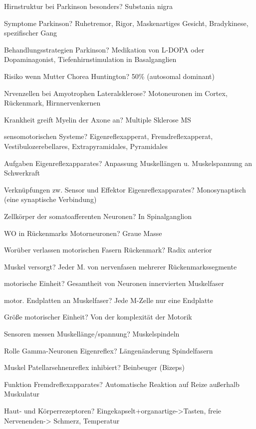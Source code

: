 \documentclass[a4paper]{article}
\begin{document}
\begin{multicols}{3}
  Hirnstruktur bei Parkinson besonders? Substania nigra

  Symptome Parkinson? Ruhetremor, Rigor, Maskenartiges Gesicht, Bradykinese, spezifischer Gang

  Behandlungsstrategien Parkinson? Medikation von L-DOPA oder Dopaminagonist, Tiefenhirnstimulation in Basalganglien

  Risiko wenn Mutter Chorea Huntington? 50\% (autosomal dominant)

  Nrvenzellen bei Amyotrophen Lateralsklerose? Motoneuronen im Cortex, Rückenmark, Hirnnervenkernen

  Krankheit greift Myelin der Axone an? Multiple Sklerose MS


  sensomotorischen Systeme? Eigenreflexapperat, Fremdreflexapperat, Vestibulozerebellares, Extrapyramidales, Pyramidales

  Aufgaben Eigenreflexapparates? Anpassung Muskellängen u. Muskelspannung an Schwerkraft

  Verknüpfungen zw. Sensor und Effektor Eigenreflexapparates? Monosynaptisch (eine synaptische Verbindung)

  Zellkörper der somatoafferenten Neuronen? In Spinalganglion%

  WO in Rückenmarks Motorneuronen? Graue Masse

  Worüber verlassen motorischen Fasern Rückenmark? Radix anterior

  Muskel versorgt? Jeder M. von nervenfasen mehrerer Rückenmarkssegmente

  motorische Einheit? Gesamtheit von Neuronen innervierten Muskelfaser

  motor. Endplatten an Muskelfaser? Jede M-Zelle nur eine Endplatte

  Größe motorischer Einheit? Von der komplexität der Motorik

  Sensoren messen Muskellänge/spannung? Muskelspindeln

  Rolle Gamma-Neuronen Eigenreflex? Längenänderung Spindelfasern

  Muskel Patellarsehnenreflex inhibiert? Beinbeuger (Bizeps)

  Funktion Fremdreflexapparates? Automatische Reaktion auf Reize außerhalb Muskulatur

  Haut- und Körperrezeptoren? Eingekapselt+organartige->Tasten, freie Nervenenden-> Schmerz, Temperatur


\end{multicols}
\end{document}
